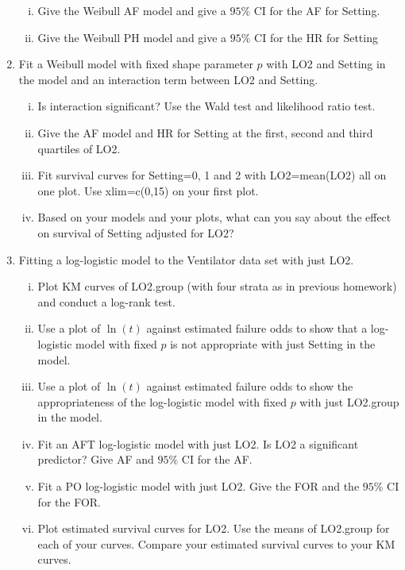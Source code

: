 \documentclass[12pt]{article}
\begin{document}
\begin{enumerate}[1.]
\begin{enumerate}[i.]
\item Give the Weibull AF model and  give a $95\%$ CI for the AF for Setting.
\item Give the Weibull PH model and give a  $95\%$ CI for the HR for Setting
\end{enumerate}
\item Fit a Weibull model with fixed shape parameter $p$ with LO2 and Setting in the model and an interaction term between LO2 and Setting.
\begin{enumerate}[i.]
\item Is interaction significant? Use the Wald test and likelihood ratio test.
\item Give the AF model and HR for Setting at the first, second and third quartiles of LO2.
\item Fit survival curves for Setting=0, 1 and 2 with LO2=mean(LO2) all on one plot. Use xlim=c(0,15) on your first plot.
\item Based on your models and your plots, what can you say about the effect on survival of Setting adjusted for LO2?
\end{enumerate}
\item Fitting a log-logistic model to the Ventilator data set with just LO2.
\begin{enumerate}[i.]

\item Plot KM curves of LO2.group (with four strata as in previous homework) and conduct a log-rank test.
\item Use a plot of $\ln(t)$ against estimated failure odds to show that a log-logistic model with fixed $p$  is not appropriate with just Setting in the model.
\item Use a plot of $\ln(t)$ against estimated failure odds to show the appropriateness of the log-logistic model with fixed $p$ with just LO2.group in the model.
\item Fit an AFT log-logistic model with just LO2. Is LO2 a significant predictor? Give AF and $95\%$ CI for the AF.
\item Fit a PO log-logistic model with just LO2. Give the FOR and the $95\%$ CI for the FOR.
\item Plot estimated survival curves for LO2. Use the means of LO2.group for each of your curves. Compare your estimated survival curves to your KM curves.
\end{enumerate}
\end{enumerate}
\end{document}
